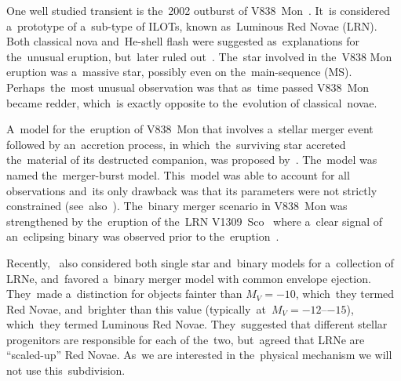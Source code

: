 \documentclass[galaxies,article,accept,moreauthors,pdftex]{mdpi}
\begin{document}
One well studied transient is the~2002 outburst of V838~Mon~\citep{Bondetal2003}. It~is considered a~prototype of a~sub-type of ILOTs, known as~Luminous Red Novae (LRN). Both classical nova and~He-shell flash were suggested as~explanations for the~unusual eruption, but~later ruled out~\citep{TylendaSoker2006}. The~star involved in the~V838 Mon eruption was a~massive star, possibly even on the~main-sequence (MS). Perhaps~the~most unusual observation was that as~time passed V838~Mon became redder\citep{Evansetal2003,Starrfieldetal2005}, which~is exactly opposite to the~evolution of classical~novae.

A~model for the~eruption of V838~Mon that involves a~stellar merger event followed by an~accretion process, in which~the~surviving star accreted the~material of its destructed companion, was proposed by~\cite{SokerTylenda2006}. The~model was named the~merger-burst model. This~model was able to account for all observations and~its only drawback was that its parameters were not strictly constrained (see~also~\cite{Tylendaetal2005, TylendaSoker2006}). The~binary merger scenario in V838~Mon was strengthened by the~eruption of the~LRN V1309~Sco~\citep{Mason2010} where a~clear signal of an~eclipsing binary was observed prior to the~eruption~\citep{Tylendaetal2011}.

Recently,~\cite{Pastorelloetal2019b} also considered both single star and~binary models for a~collection of LRNe, and~favored a~binary merger model with common envelope ejection. They~made a~distinction for objects fainter than $M_V=-10$, which~they termed Red Novae, and~brighter than this value (typically~at~$M_V=-12$--$-15$), which~they termed Luminous Red Novae. They~suggested that different stellar progenitors are responsible for each of the~two, but~agreed that LRNe are ``scaled-up'' Red Novae. As~we are interested in the~physical mechanism we will not use this~subdivision.
\end{document}
